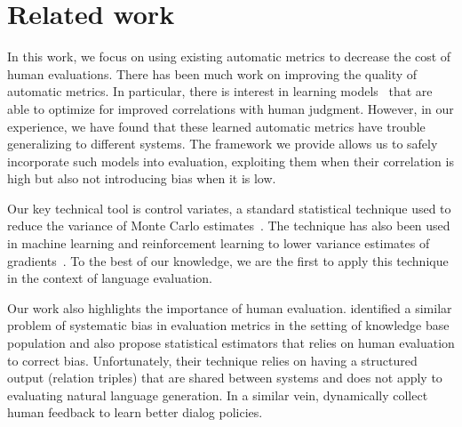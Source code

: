 \section{\label{sec:setup} Related work}

In this work, we focus on using existing automatic metrics to decrease the cost of human evaluations.
There has been much work on improving the quality of automatic metrics.
In particular, there is interest in learning models~\citep{lowe2017towards,dusek2017referenceless} that are able to optimize for improved correlations with human judgment.
However, in our experience, we have found that these learned automatic metrics have trouble generalizing to different systems.
The framework we provide allows us to safely incorporate such models into evaluation, exploiting them when their correlation is high but also not introducing bias when it is low.

Our key technical tool is control variates, a standard statistical technique used to reduce the variance of Monte Carlo estimates~\citep{ripley2009stochastic}.
The technique has also been used in machine learning and reinforcement learning to lower variance estimates of gradients~\citep{greensmith2004variance, paisley2012variational, ranganath2014black}.
To the best of our knowledge, we are the first to apply this technique in the context of language evaluation.

Our work also highlights the importance of human evaluation.
\citet{chaganty2017unbiased} identified a similar problem of systematic bias in evaluation metrics in the setting of knowledge base population and also propose statistical estimators that relies on human evaluation to correct bias.
Unfortunately, their technique relies on having a structured output (relation triples) that are shared between systems and does not apply to evaluating natural language generation.
In a similar vein, \citet{chang2017affordable} dynamically collect human feedback to learn better dialog policies.



